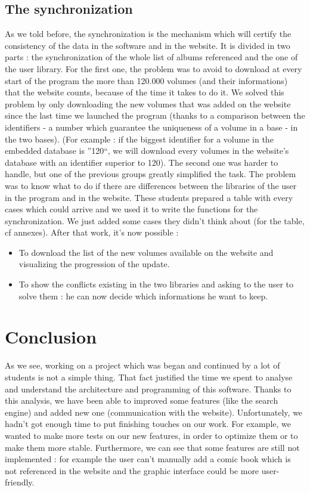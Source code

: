 \documentclass[11pt]{report} %
\begin{document}
\section{The synchronization}
As we told before, the synchronization is the mechanism which will certify the consistency of the data in the software and in the website. It is divided in two parts : the synchronization of the whole list of albums referenced and the one of the user library.
\newline For the first one, the problem was to avoid to download at every start of the program the more than 120.000 volumes (and their informations) that the website counts, because of the time it takes to do it. We solved this problem by only downloading the new volumes that was added on the website since the last time we launched the program (thanks to a comparison between the identifiers - a number which guarantee the uniqueness of a volume in a base - in the two bases).
\newline(For example : if the biggest identifier for a volume in the embedded database is ''120``, we will download every volumes in the website's database with an identifier superior to 120).
\newline The second one was harder to handle, but one of the previous groups greatly simplified the task. The problem was to know what to do if there are differences between the libraries of the user in the program and in the website. These students prepared a table with every cases which could arrive and we used it to write the functions for the synchronization. We just added some cases they didn't think about (for the table, cf annexes).
\newline After that work, it's now possible :
\begin{itemize}
\item To download the list of the new volumes available on the website and visualizing the progression of the update.
\item To show the conflicts existing in the two libraries and asking to the user to solve them : he can now decide which informations he want to keep.
\end{itemize}


\chapter{Conclusion}
As we see, working on a project which was began and continued by a lot of students is not a simple thing. That fact justified the time we spent to analyse and understand the architecture and programming of this software. Thanks to this analysis, we have been able to improved some features (like the search engine) and added new one (communication with the website). 
\newline Unfortunately, we hadn't got enough time to put finishing touches on our work. For example, we wanted to make more tests on our new features, in order to optimize them or to make them more stable.
\newline Furthermore, we can see that some features are still not implemented : for example the user can't manually add a comic book which is not referenced in the website and the graphic interface could be more user-friendly.


\appendix




\end{document}
